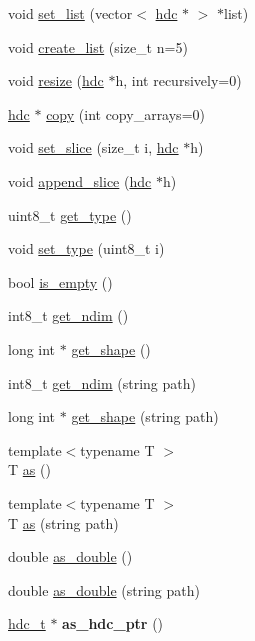 \begin{DoxyCompactItemize}
\item 
void \hyperlink{classhdc_ae3cf31bad48437a48ad1291e2db99873}{set\+\_\+list} (vector$<$ \hyperlink{classhdc}{hdc} $\ast$ $>$ $\ast$list)
\item 
void \hyperlink{classhdc_ab88feab4710f598b8a56b529fd01dede}{create\+\_\+list} (size\+\_\+t n=5)
\item 
void \hyperlink{classhdc_ad782f111cf0c869166ed9f4ac51405a6}{resize} (\hyperlink{classhdc}{hdc} $\ast$h, int recursively=0)
\item 
\hyperlink{classhdc}{hdc} $\ast$ \hyperlink{classhdc_af5d54732a2d9d34f7f2f8453acda21d6}{copy} (int copy\+\_\+arrays=0)
\item 
void \hyperlink{classhdc_a3d4c2ba09c79e2dfbe7be7bd59bd811e}{set\+\_\+slice} (size\+\_\+t i, \hyperlink{classhdc}{hdc} $\ast$h)
\item 
void \hyperlink{classhdc_aaffff0cd041746fd45a2d2c67d73ce75}{append\+\_\+slice} (\hyperlink{classhdc}{hdc} $\ast$h)
\item 
uint8\+\_\+t \hyperlink{classhdc_ac12e6d9074533304ea4d3eb08623d774}{get\+\_\+type} ()
\item 
void \hyperlink{classhdc_a6d1d1064db92be176775481eb6ca9fd3}{set\+\_\+type} (uint8\+\_\+t i)
\item 
bool \hyperlink{classhdc_af1a86c27a06e02651f544947eb9b0cfb}{is\+\_\+empty} ()
\item 
int8\+\_\+t \hyperlink{classhdc_a759758dd2b6b8986341753e94ad12252}{get\+\_\+ndim} ()
\item 
long int $\ast$ \hyperlink{classhdc_aa73e21aec9037f1f6bf9bb899f743b00}{get\+\_\+shape} ()
\item 
int8\+\_\+t \hyperlink{classhdc_ac8d2e3eb577519c8caa5ea59a34ae75b}{get\+\_\+ndim} (string path)
\item 
long int $\ast$ \hyperlink{classhdc_a9684ce622a000411e1c747f4f694c92f}{get\+\_\+shape} (string path)
\item 
{\footnotesize template$<$typename T $>$ }\\T \hyperlink{classhdc_ae35cce784c60574515001b66d0271fa9}{as} ()
\item 
{\footnotesize template$<$typename T $>$ }\\T \hyperlink{classhdc_ac1dd72a041586072f7984022ba8a048e}{as} (string path)
\item 
double \hyperlink{classhdc_a12e3492b3755543da2c6b1571629e23c}{as\+\_\+double} ()
\item 
double \hyperlink{classhdc_a10b21a25e3429e9844084b74a8bacbaa}{as\+\_\+double} (string path)
\item 
\hyperlink{structhdc__t}{hdc\+\_\+t} $\ast$ {\bfseries as\+\_\+hdc\+\_\+ptr} ()\hypertarget{classhdc_aea48e6e093255899e87151031408d0eb}{}\label{classhdc_aea48e6e093255899e87151031408d0eb}


\end{DoxyCompactItemize}

